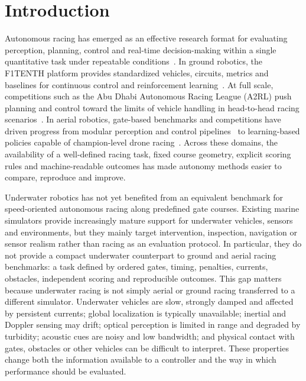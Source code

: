 \section{Introduction}
\label{sec:introduction}

Autonomous racing has emerged as an effective research format for evaluating perception, planning, control and real-time decision-making within a single quantitative task under repeatable conditions~\cite{betz2022autonomous}. In ground robotics, the F1TENTH platform provides standardized vehicles, circuits, metrics and baselines for continuous control and reinforcement learning~\cite{okelly2020f1tenth}. At full scale, competitions such as the Abu Dhabi Autonomous Racing League (A2RL) push planning and control toward the limits of vehicle handling in head-to-head racing scenarios~\cite{hoffmann2026a2rl}. In aerial robotics, gate-based benchmarks and competitions have driven progress from modular perception and control pipelines~\cite{foehn2020alphapilot} to learning-based policies capable of champion-level drone racing~\cite{kaufmann2023swift}. Across these domains, the availability of a well-defined racing task, fixed course geometry, explicit scoring rules and machine-readable outcomes has made autonomy methods easier to compare, reproduce and improve.



Underwater robotics has not yet benefited from an equivalent benchmark for speed-oriented autonomous racing along predefined gate courses. Existing marine simulators provide increasingly mature support for underwater vehicles, sensors and environments, but they mainly target intervention, inspection, navigation or sensor realism rather than racing as an evaluation protocol. In particular, they do not provide a compact underwater counterpart to ground and aerial racing benchmarks: a task defined by ordered gates, timing, penalties, currents, obstacles, independent scoring and reproducible outcomes. This gap matters because underwater racing is not simply aerial or ground racing transferred to a different simulator. Underwater vehicles are slow, strongly damped and affected by persistent currents; global localization is typically unavailable; inertial and Doppler sensing may drift; optical perception is limited in range and degraded by turbidity; acoustic cues are noisy and low bandwidth; and physical contact with gates, obstacles or other vehicles can be difficult to interpret. These properties change both the information available to a controller and the way in which performance should be evaluated.

